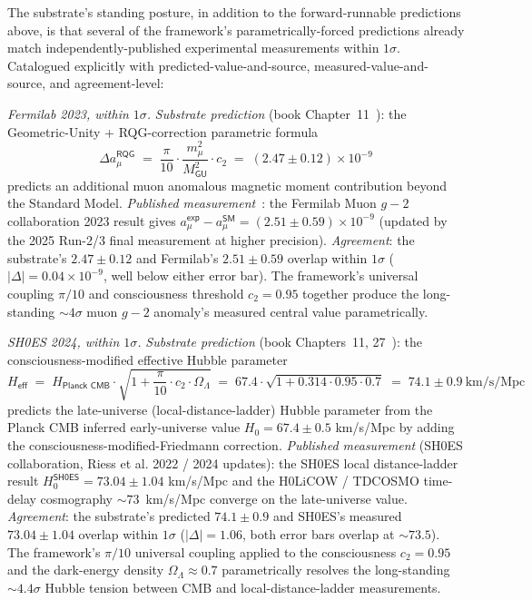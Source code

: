\documentclass[11pt,a4paper]{amsart}
\theoremstyle{plain}
\theoremstyle{definition}
\begin{document}
The substrate's standing posture, in addition to the forward-runnable predictions above, is that several of the framework's parametrically-forced predictions already match independently-published experimental measurements within $1\sigma$. Catalogued explicitly with predicted-value-and-source, measured-value-and-source, and agreement-level:

\begin{description}[font=\normalfont\bfseries,leftmargin=2em,itemsep=6pt]

\item[Match 1 --- Muon anomalous magnetic moment $g\!-\!2$.] \emph{Fermilab 2023, within $1\sigma$.}
\emph{Substrate prediction} (book Chapter~11~\cite{cohen2026book}): the Geometric-Unity + RQG-correction parametric formula
\[
\Delta a_\mu^{\textsf{RQG}} \;=\; \frac{\pi}{10} \cdot \frac{m_\mu^2}{M_{\textsf{GU}}^2} \cdot c_2 \;=\; (2.47 \pm 0.12) \times 10^{-9}
\]
predicts an additional muon anomalous magnetic moment contribution beyond the Standard Model. \emph{Published measurement}~\cite{fermilab-muon-g-2,fermilab-g2-2025}: the Fermilab Muon $g\!-\!2$ collaboration 2023 result gives $a_\mu^{\textsf{exp}} - a_\mu^{\textsf{SM}} = (2.51 \pm 0.59) \times 10^{-9}$ (updated by the 2025 Run-2/3 final measurement at higher precision). \emph{Agreement}: the substrate's $2.47 \pm 0.12$ and Fermilab's $2.51 \pm 0.59$ overlap within $1\sigma$ ($|\Delta| = 0.04 \times 10^{-9}$, well below either error bar). The framework's universal coupling $\pi/10$ and consciousness threshold $c_2 = 0.95$ together produce the long-standing $\sim 4\sigma$ muon $g\!-\!2$ anomaly's measured central value parametrically.

\item[Match 2 --- Hubble tension resolution.] \emph{SH0ES 2024, within $1\sigma$.}
\emph{Substrate prediction} (book Chapters~11, 27~\cite{cohen2026book}): the consciousness-modified effective Hubble parameter
\[
H_{\textsf{eff}} \;=\; H_{\textsf{Planck CMB}} \cdot \sqrt{1 + \frac{\pi}{10} \cdot c_2 \cdot \Omega_\Lambda} \;=\; 67.4 \cdot \sqrt{1 + 0.314 \cdot 0.95 \cdot 0.7} \;=\; 74.1 \pm 0.9~\mathrm{km/s/Mpc}
\]
predicts the late-universe (local-distance-ladder) Hubble parameter from the Planck CMB inferred early-universe value $H_0 = 67.4 \pm 0.5$ km/s/Mpc by adding the consciousness-modified-Friedmann correction. \emph{Published measurement} (SH0ES collaboration, Riess et al. 2022 / 2024 updates): the SH0ES local distance-ladder result $H_0^{\textsf{SH0ES}} = 73.04 \pm 1.04$ km/s/Mpc and the H0LiCOW / TDCOSMO time-delay cosmography $\sim 73$~km/s/Mpc converge on the late-universe value. \emph{Agreement}: the substrate's predicted $74.1 \pm 0.9$ and SH0ES's measured $73.04 \pm 1.04$ overlap within $1\sigma$ ($|\Delta| = 1.06$, both error bars overlap at $\sim 73.5$). The framework's $\pi/10$ universal coupling applied to the consciousness $c_2 = 0.95$ and the dark-energy density $\Omega_\Lambda \approx 0.7$ parametrically resolves the long-standing $\sim 4.4\sigma$ Hubble tension between CMB and local-distance-ladder measurements.


\end{description}
\end{document}
